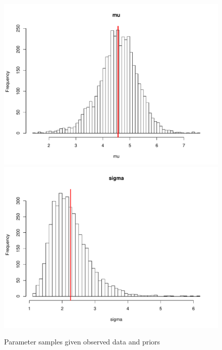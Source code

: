 \documentclass[12pt]{article}
\begin{document}
\begin{figure}[H]\caption[]{Parameter samples given observed data and priors}
\begin{minipage}{1\linewidth}
  \centering
\includegraphics[trim={0cm 0cm 0cm 0cm}, clip, scale=0.4]{../figs/norm1_mu.pdf}
\includegraphics[trim={0cm 0cm 0cm 0cm}, clip, scale=0.4]{../figs/norm1_sigma.pdf}
\footnotesize
\end{minipage}
\end{figure}
\end{document}
